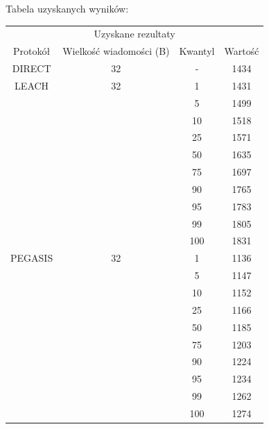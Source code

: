 \documentclass[a4paper,12pt,twoside,openany]{report}
\begin{document}
Tabela uzyskanych wyników:

\begin{longtable}{*{4}{c}}
\toprule
\multicolumn{4}{c}{Uzyskane rezultaty} \\
Protokół	& Wielkość wiadomości (B)	& Kwantyl	& Wartość \\
\midrule
\endhead
DIRECT	& 32 	& -	& 1434 \\*
\midrule
LEACH	& 32	& 1	& 1431 \\*
	&	& 5	& 1499 \\*
	&	& 10	& 1518 \\*
	&	& 25	& 1571 \\*
	&	& 50	& 1635 \\*
	&	& 75	& 1697 \\*
	&	& 90	& 1765 \\*
	&	& 95	& 1783 \\*
	&	& 99	& 1805 \\*
	&	& 100	& 1831 \\*
\midrule
PEGASIS	& 32	& 1	& 1136 \\*
	&	& 5	& 1147 \\*
	&	& 10	& 1152 \\*
	&	& 25	& 1166 \\*
	&	& 50	& 1185 \\*
	&	& 75	& 1203 \\*
	&	& 90	& 1224 \\*
	&	& 95	& 1234 \\*
	&	& 99	& 1262 \\*
	&	& 100	& 1274 \\*
\bottomrule
\end{longtable}
\end{document}
